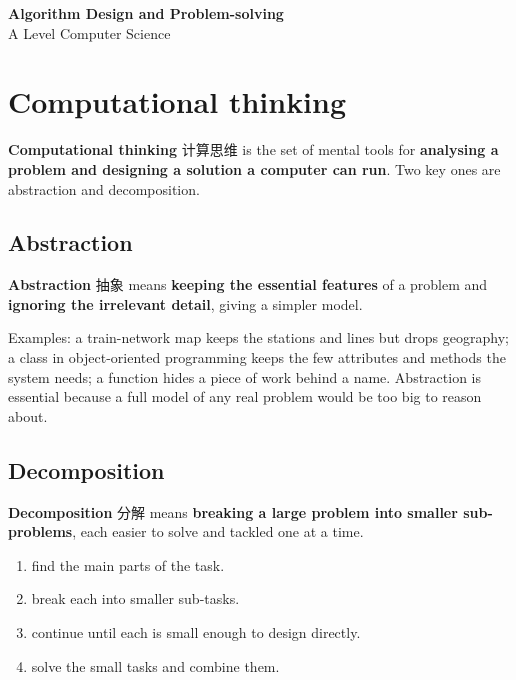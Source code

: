 \documentclass[11pt]{article}
\begin{document}
\begin{center}
  {\LARGE\bfseries Algorithm Design and Problem-solving}\\[0.35em]
  {\large A Level Computer Science}
\end{center}
\vspace{0.6em}

\section*{Computational thinking}

\textbf{Computational thinking} 计算思维 is the set of mental tools for \textbf{analysing a problem and designing a solution a computer can run}. Two key ones are abstraction and decomposition.

\subsection*{Abstraction}

\textbf{Abstraction} 抽象 means \textbf{keeping the essential features} of a problem and \textbf{ignoring the irrelevant detail}, giving a simpler model.

Examples: a train-network map keeps the stations and lines but drops geography; a class in object-oriented programming keeps the few attributes and methods the system needs; a function hides a piece of work behind a name. Abstraction is essential because a full model of any real problem would be too big to reason about.

\subsection*{Decomposition}

\textbf{Decomposition} 分解 means \textbf{breaking a large problem into smaller sub-problems}, each easier to solve and tackled one at a time.

\begin{enumerate}
\item find the main parts of the task.

\item break each into smaller sub-tasks.

\item continue until each is small enough to design directly.

\item solve the small tasks and combine them.

\end{enumerate}
\end{document}
